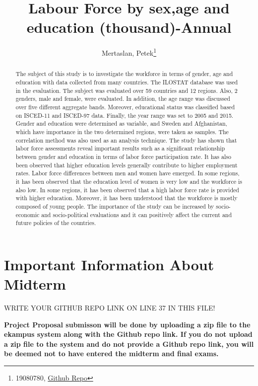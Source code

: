 \documentclass[
  12pt,
]{article}
\title{Labour Force by sex,age and education (thousand)-Annual}
\author{Mertaslan, Petek\footnote{19080780, \href{https://github.com/petekmertaslan/final.git}{Github Repo}}}
\date{}
\begin{document}
\maketitle
\begin{abstract}
The subject of this study is to investigate the workforce in terms of gender, age and education with data collected from many countries. The ILOSTAT database was used in the evaluation. The subject was evaluated over 59 countries and 12 regions. Also, 2 genders, male and female, were evaluated. In addition, the age range was discussed over five different aggregate bands. Moreover, educational status was classified based on ISCED-11 and ISCED-97 data. Finally, the year range was set to 2005 and 2015. Gender and education were determined as variable, and Sweden and Afghanistan, which have importance in the two determined regions, were taken as samples. The correlation method was also used as an analysis technique. The study has shown that labor force assessments reveal important results such as a significant relationship between gender and education in terms of labor force participation rate. It has also been observed that higher education levels generally contribute to higher employment rates. Labor force differences between men and women have emerged. In some regions, it has been observed that the education level of women is very low and the workforce is also low. In some regions, it has been observed that a high labor force rate is provided with higher education. Moreover, it has been understood that the workforce is mostly composed of young people. The importance of the study can be increased by socio-economic and socio-political evaluations and it can positively affect the current and future policies of the countries.
\end{abstract}

\hypertarget{important-information-about-midterm}{%
\section{Important Information About Midterm}\label{important-information-about-midterm}}

\colorbox{BurntOrange}{WRITE YOUR GITHUB REPO LINK ON LINE 37 IN THIS FILE!}

\textbf{Project Proposal submisson will be done by uploading a zip file to the ekampus system along with the Github repo link. If you do not upload a zip file to the system and do not provide a Github repo link, you will be deemed not to have entered the midterm and final exams.}
\end{document}
